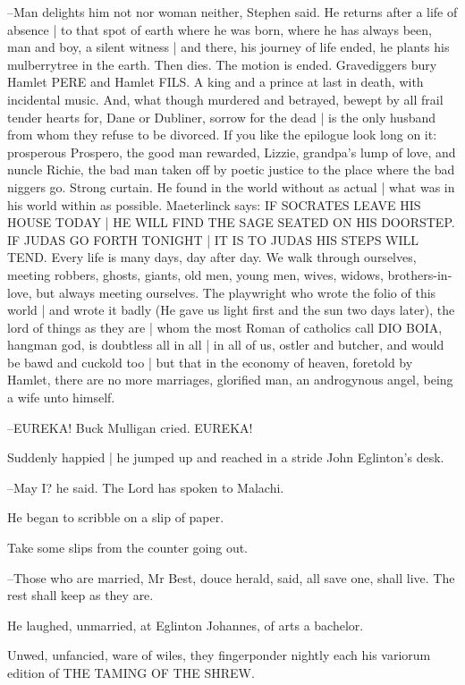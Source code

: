 --Man delights him not nor woman neither,
Stephen said.
He returns after a life of absence |
to that spot of earth where he was born,
where he has always been,
man and boy,
a silent witness |
and there,
his journey of life ended,
he plants his mulberrytree in the earth.
Then dies.
The motion is ended.
Gravediggers bury Hamlet PERE and Hamlet FILS.
A king and a prince at last in death,
with incidental music.
And, what though murdered and betrayed,
bewept by all frail tender hearts for,
Dane or Dubliner,
sorrow for the dead |
is the only husband from whom they refuse to be divorced.
If you like the epilogue look long on it:
prosperous Prospero,
the good man rewarded,
Lizzie, grandpa's lump of love,
and nuncle Richie,
the bad man taken off by poetic justice to the place where the bad niggers go.
Strong curtain.
He found in the world without as actual |
what was in his world within as possible.
Maeterlinck says:
IF SOCRATES LEAVE HIS HOUSE TODAY |
HE WILL FIND THE SAGE SEATED ON HIS DOORSTEP.
IF JUDAS GO FORTH TONIGHT |
IT IS TO JUDAS HIS STEPS WILL TEND.
Every life is many days,
day after day.
We walk through ourselves,
meeting robbers, ghosts, giants,
old men, young men,
wives, widows,
brothers-in-love,
but always meeting ourselves.
The playwright who wrote the folio of this world |
and wrote it badly
(He gave us light first and the sun two days later),
the lord of things as they are |
whom the most Roman of catholics call DIO BOIA,
hangman god,
is doubtless all in all |
in all of us,
ostler and butcher,
and would be bawd and cuckold too |
but that in the economy of heaven,
foretold by Hamlet,
there are no more marriages,
glorified man,
an androgynous angel,
being a wife unto himself.

--EUREKA!
Buck Mulligan cried.
EUREKA!

Suddenly happied |
he jumped up and reached in a stride John Eglinton's desk.

--May I?
he said.
The Lord has spoken to Malachi.

He began to scribble on a slip of paper.

Take some slips from the counter going out.

--Those who are married, Mr Best, douce herald, said, all save one, shall live. The rest shall keep as they are.

He laughed, unmarried, at Eglinton Johannes, of arts a bachelor.

Unwed, unfancied, ware of wiles, they fingerponder nightly each his variorum edition of THE TAMING OF THE SHREW.

